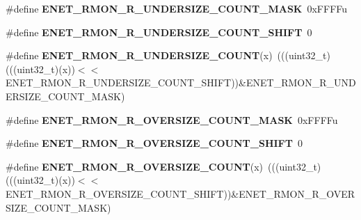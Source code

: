 \begin{DoxyCompactItemize}
\item 
\#define {\bfseries E\+N\+E\+T\+\_\+\+R\+M\+O\+N\+\_\+\+R\+\_\+\+U\+N\+D\+E\+R\+S\+I\+Z\+E\+\_\+\+C\+O\+U\+N\+T\+\_\+\+M\+A\+SK}~0x\+F\+F\+F\+Fu\hypertarget{group__ENET__Register__Masks_ga8a24b45ac31e9bb082d18e378e634dad}{}\label{group__ENET__Register__Masks_ga8a24b45ac31e9bb082d18e378e634dad}

\item 
\#define {\bfseries E\+N\+E\+T\+\_\+\+R\+M\+O\+N\+\_\+\+R\+\_\+\+U\+N\+D\+E\+R\+S\+I\+Z\+E\+\_\+\+C\+O\+U\+N\+T\+\_\+\+S\+H\+I\+FT}~0\hypertarget{group__ENET__Register__Masks_gaea02d213bcae36ffe06ff62931d8af0d}{}\label{group__ENET__Register__Masks_gaea02d213bcae36ffe06ff62931d8af0d}

\item 
\#define {\bfseries E\+N\+E\+T\+\_\+\+R\+M\+O\+N\+\_\+\+R\+\_\+\+U\+N\+D\+E\+R\+S\+I\+Z\+E\+\_\+\+C\+O\+U\+NT}(x)~(((uint32\+\_\+t)(((uint32\+\_\+t)(x))$<$$<$E\+N\+E\+T\+\_\+\+R\+M\+O\+N\+\_\+\+R\+\_\+\+U\+N\+D\+E\+R\+S\+I\+Z\+E\+\_\+\+C\+O\+U\+N\+T\+\_\+\+S\+H\+I\+FT))\&E\+N\+E\+T\+\_\+\+R\+M\+O\+N\+\_\+\+R\+\_\+\+U\+N\+D\+E\+R\+S\+I\+Z\+E\+\_\+\+C\+O\+U\+N\+T\+\_\+\+M\+A\+SK)\hypertarget{group__ENET__Register__Masks_gaa7cdec7b69c65dc05143f3f864e6bbc4}{}\label{group__ENET__Register__Masks_gaa7cdec7b69c65dc05143f3f864e6bbc4}

\item 
\#define {\bfseries E\+N\+E\+T\+\_\+\+R\+M\+O\+N\+\_\+\+R\+\_\+\+O\+V\+E\+R\+S\+I\+Z\+E\+\_\+\+C\+O\+U\+N\+T\+\_\+\+M\+A\+SK}~0x\+F\+F\+F\+Fu\hypertarget{group__ENET__Register__Masks_ga3d8f160025d5d600fd7206e6fc762fc1}{}\label{group__ENET__Register__Masks_ga3d8f160025d5d600fd7206e6fc762fc1}

\item 
\#define {\bfseries E\+N\+E\+T\+\_\+\+R\+M\+O\+N\+\_\+\+R\+\_\+\+O\+V\+E\+R\+S\+I\+Z\+E\+\_\+\+C\+O\+U\+N\+T\+\_\+\+S\+H\+I\+FT}~0\hypertarget{group__ENET__Register__Masks_ga3e279c65a9e7d91eef6b4f228c028f47}{}\label{group__ENET__Register__Masks_ga3e279c65a9e7d91eef6b4f228c028f47}

\item 
\#define {\bfseries E\+N\+E\+T\+\_\+\+R\+M\+O\+N\+\_\+\+R\+\_\+\+O\+V\+E\+R\+S\+I\+Z\+E\+\_\+\+C\+O\+U\+NT}(x)~(((uint32\+\_\+t)(((uint32\+\_\+t)(x))$<$$<$E\+N\+E\+T\+\_\+\+R\+M\+O\+N\+\_\+\+R\+\_\+\+O\+V\+E\+R\+S\+I\+Z\+E\+\_\+\+C\+O\+U\+N\+T\+\_\+\+S\+H\+I\+FT))\&E\+N\+E\+T\+\_\+\+R\+M\+O\+N\+\_\+\+R\+\_\+\+O\+V\+E\+R\+S\+I\+Z\+E\+\_\+\+C\+O\+U\+N\+T\+\_\+\+M\+A\+SK)\hypertarget{group__ENET__Register__Masks_gac5c81ea4fdcc881701c632c99e58a341}{}\label{group__ENET__Register__Masks_gac5c81ea4fdcc881701c632c99e58a341}


\end{DoxyCompactItemize}
